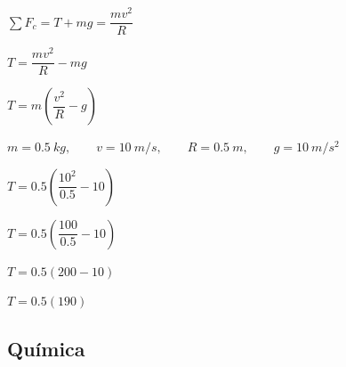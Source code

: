 \begin{enumerate}[resume]
	$\sum F_c=T+mg=\dfrac{mv^2}{R}$
	
	
	$T=\dfrac{mv^2}{R}-mg$
	
	$T=m\left(\dfrac{v^2}{R}-g\right)$
	
	$m=0{.}5\ kg,\qquad v=10\ m/s,\qquad R=0{.}5\ m,\qquad g=10\ m/s^2$
	
	$T=0{.}5\left(\dfrac{10^2}{0{.}5}-10\right)$
	
	$T=0{.}5\left(\dfrac{100}{0{.}5}-10\right)$
	
	$T=0{.}5(200-10)$
	
	$T=0{.}5(190)$
	
	
	\vspace{6mm}
	
	
	
	
	
	
\end{enumerate}


\subsection*{Química}

